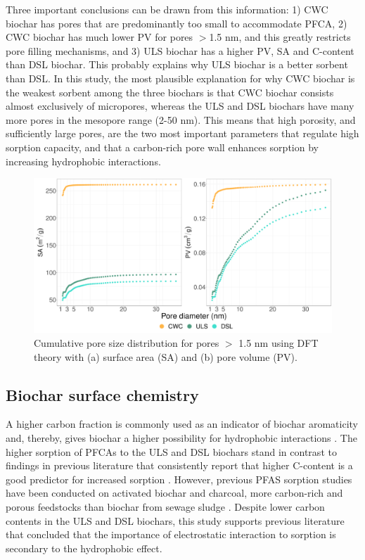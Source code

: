 Three important conclusions can be drawn from this information: 1) CWC biochar has pores that are predominantly too small to accommodate PFCA, 2) CWC biochar has much lower PV for pores $>$1.5 nm, and this greatly restricts pore filling mechanisms, and 3) ULS biochar has a higher PV, SA and C-content than DSL biochar. This probably explains why ULS biochar is a better sorbent than DSL. In this study, the most plausible explanation for why CWC biochar is the weakest sorbent among the three biochars is that CWC biochar consists almost exclusively of micropores, whereas the ULS and DSL biochars have many more pores in the mesopore range (2-50 nm). This means that high porosity, and sufficiently large pores, are the two most important parameters that regulate high sorption capacity, and that a carbon-rich pore wall enhances sorption by increasing hydrophobic interactions. 

\begin{figure}[htb]
    \centering
    \includegraphics[width=\textwidth]{R/figs/PZD_SA_PV_plot_large.pdf}
    \caption{Cumulative pore size distribution for pores $>$ 1.5 nm using DFT theory with (a) surface area (SA) and (b) pore volume (PV).}
    \label{fig:PZD_large}
\end{figure}

\subsection{Biochar surface chemistry}
A higher carbon fraction is commonly used as an indicator of biochar aromaticity and, thereby, gives biochar a higher possibility for hydrophobic interactions \citep{Cornelissen2005}. The higher sorption of PFCAs to the ULS and DSL biochars stand in contrast to findings in previous literature that consistently report that higher C-content is a good predictor for increased sorption \citep{fabregat2022examining}. However, previous PFAS sorption studies have been conducted on activated biochar and charcoal, more carbon-rich and porous feedstocks than biochar from sewage sludge \citep{Sormo2021, zhang2021sorption}. Despite lower carbon contents in the ULS and DSL biochars, this study supports previous literature that concluded that the importance of electrostatic interaction to sorption is secondary to the hydrophobic effect. 

